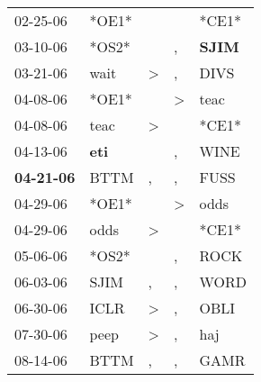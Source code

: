 \begin{supertabular}{p{0.07\textwidth}p{0.06\textwidth}p{0.02\textwidth}p{0.02\textwidth}p{0.06\textwidth}}
          02-25-06\textsuperscript{} &                            *OE1* &                  &                  &                            *CE1* \\
          03-10-06\textsuperscript{} &                            *OS2* &                  &                , &  \textbf{SJIM\textsuperscript{}} \\
          03-21-06\textsuperscript{} &           wait\textsuperscript{} &     \textgreater &                , &           DIVS\textsuperscript{} \\
          04-08-06\textsuperscript{} &                            *OE1* &                  &     \textgreater &           teac\textsuperscript{} \\
          04-08-06\textsuperscript{} &           teac\textsuperscript{} &     \textgreater &                  &                            *CE1* \\
          04-13-06\textsuperscript{} &   \textbf{eti\textsuperscript{}} &                  &                , &           WINE\textsuperscript{} \\
 \textbf{04-21-06\textsuperscript{}} &           BTTM\textsuperscript{} &                , &                , &           FUSS\textsuperscript{} \\
          04-29-06\textsuperscript{} &                            *OE1* &                  &     \textgreater &           odds\textsuperscript{} \\
          04-29-06\textsuperscript{} &           odds\textsuperscript{} &     \textgreater &                  &                            *CE1* \\
          05-06-06\textsuperscript{} &                            *OS2* &                  &                , &           ROCK\textsuperscript{} \\
          06-03-06\textsuperscript{} &           SJIM\textsuperscript{} &                , &                , &           WORD\textsuperscript{} \\
          06-30-06\textsuperscript{} &           ICLR\textsuperscript{} &     \textgreater &                , &           OBLI\textsuperscript{} \\
          07-30-06\textsuperscript{} &           peep\textsuperscript{} &     \textgreater &                , &            haj\textsuperscript{} \\
          08-14-06\textsuperscript{} &           BTTM\textsuperscript{} &                , &                , &           GAMR\textsuperscript{} \\

\end{supertabular}
